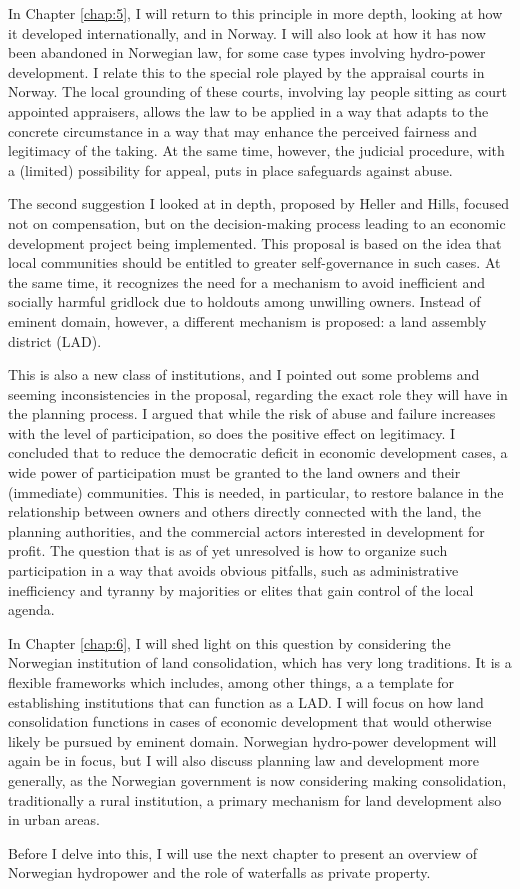 \documentclass[12pt,a4paper]{book} %
\begin{document}
In Chapter \ref{chap:5}, I will return to this principle in more depth, looking at how it developed internationally, and in Norway. I will also look at how it has now been abandoned in Norwegian law, for some case types involving hydro-power development. I relate this to the special role played by the appraisal courts in Norway. The local grounding of these courts, involving lay people sitting as court appointed appraisers, allows the law to be applied in a way that adapts to the concrete circumstance in a way that may enhance the perceived fairness and legitimacy of the taking. At the same time, however, the judicial procedure, with a (limited) possibility for appeal, puts in place safeguards against abuse.

The second suggestion I looked at in depth, proposed by Heller and Hills, focused not on compensation, but on the decision-making process leading to an economic development project being implemented. This proposal is based on the idea that local communities should be entitled to greater self-governance in such cases. At the same time, it recognizes the need for a mechanism to avoid inefficient and socially harmful gridlock due to holdouts among unwilling owners. Instead of eminent domain, however, a different mechanism is proposed: a land assembly district (LAD). 

This is also a new class of institutions, and I pointed out some problems and seeming inconsistencies in the proposal, regarding the exact role they will have in the planning process. I argued that while the risk of abuse and failure increases with the level of participation, so does the positive effect on legitimacy. I concluded that to reduce the democratic deficit in economic development cases, a wide power of participation must be granted to the land owners and their (immediate) communities. This is needed, in particular, to restore balance in the relationship between owners and others directly connected with the land, the planning authorities, and the commercial actors interested in development for profit. The question that is as of yet unresolved is how to organize such participation in a way that avoids obvious pitfalls, such as administrative inefficiency and tyranny by majorities or elites that gain control of the local agenda.

In Chapter \ref{chap:6}, I will shed light on this question by considering the Norwegian institution of land consolidation, which has very long traditions. It is a flexible frameworks which includes, among other things, a a template for establishing institutions that can function as a LAD. I will focus on how land consolidation functions in cases of economic development that would otherwise likely be pursued by eminent domain. Norwegian hydro-power development will again be in focus, but I will also discuss planning law and development more generally, as the Norwegian government is now considering making consolidation, traditionally a rural institution, a primary mechanism for land development also in urban areas.

Before I delve into this, I will use the next chapter to present an overview of Norwegian hydropower and the role of waterfalls as private property.

\printbibliography
\end{document}
